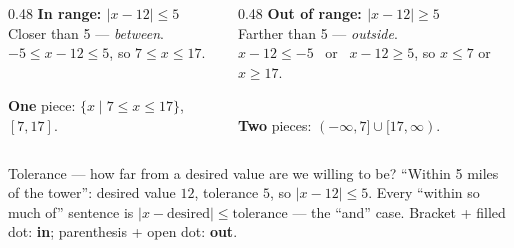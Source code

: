 \documentclass[aspectratio=169, 11pt]{beamer}
\newcommand{\trail}{%
  \draw[->, thick, charcoal] (-0.7,0)--(21.2,0) node[right, font=\tiny]{mile};
  \foreach \x in {0,...,20}{\draw[charcoal] (\x,0.22)--(\x,-0.22);}
  \foreach \x in {0,4,...,20}{\node[below, font=\tiny, charcoal] at (\x,-0.26){$\x$};}
  \fill[forest] (12,0) circle (3pt);
  \node[forest, font=\tiny, above] at (12,0.30){tower};}
\begin{document}
\begin{frame}[t, plain]
  \begin{columns}[T]
    \begin{column}{0.48\textwidth}
      \textbf{In range: $|x-12| \le 5$} \\[2pt]
      Closer than 5 --- \emph{between}. \\
      $-5 \le x-12 \le 5$, so $7 \le x \le 17$. \\[3pt]
      \centering
       \\[2pt]
      \textbf{One} piece: $\{x \mid 7\le x\le 17\}$, \; $[7,17]$.
    \end{column}
    \begin{column}{0.48\textwidth}
      \textbf{Out of range: $|x-12| \ge 5$} \\[2pt]
      Farther than 5 --- \emph{outside}. \\
      $x-12 \le -5$ \, or \, $x-12 \ge 5$, so $x \le 7$ or $x \ge 17$. \\[3pt]
      \centering
       \\[2pt]
      \textbf{Two} pieces: $(-\infty,7] \cup [17,\infty)$.
    \end{column}
  \end{columns}
  \vspace{3pt}
  \begin{block}{Tolerance --- how far from a desired value are we willing to be?}
    ``Within 5 miles of the tower'': desired value $12$, tolerance $5$, so $|x-12|\le5$.
    Every ``within so much of'' sentence is $|x-\text{desired}|\le\text{tolerance}$ --- the
    ``and'' case. \; Bracket + filled dot: \textbf{in}; parenthesis + open dot: \textbf{out}.
  \end{block}
\end{frame}
\end{document}
